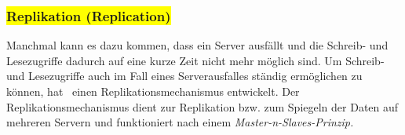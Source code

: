 \subsubsection{\colorbox{yellow}{Replikation (Replication)}}\label{replication}
Manchmal kann es dazu kommen, dass ein Server ausfällt und die Schreib- und Lesezugriffe dadurch auf eine kurze Zeit nicht mehr möglich sind. Um Schreib- und Lesezugriffe auch im Fall eines Serverausfalles ständig ermöglichen zu können, hat \mongo\ einen Replikationsmechanismus entwickelt. Der Replikationsmechanismus dient zur Replikation bzw. zum Spiegeln der Daten auf mehreren Servern und funktioniert nach einem \textit{Master-n-Slaves-Prinzip.}
